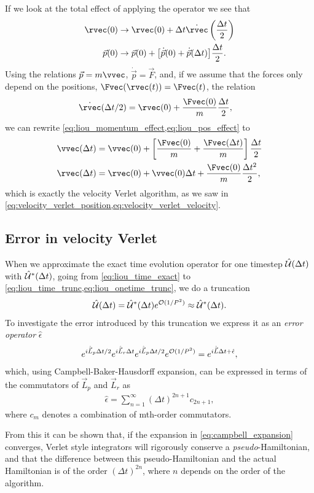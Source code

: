 If we look at the total effect of applying the operator we see that
\begin{align}
    \rvec(0)
    &\rightarrow \rvec(0) + \Delta t \dot\rvec\left(\frac{\Delta t}{2}\right) \label{eq:liou_pos_effect} \\
    \vec p(0) 
    &\rightarrow \vec p(0) + \big[\dot{\vec p}(0) + \dot{\vec p}(\Delta t) \big] \frac{\Delta t}{2} \label{eq:liou_momentum_effect}.
\end{align}
Using the relations $\vec p = m\vvec$, $\dot{\vec p} = \vec F$, and, if we assume that the forces only depend on the positions, $\Fvec(\rvec(t)) = \Fvec(t)$, the relation 
\begin{align*}
    &\dot\rvec(\Delta t/2) = \rvec(0) + \frac{\Fvec(0)}{m} \frac{\Delta t}{2},
\end{align*}
we can rewrite \cref{eq:liou_momentum_effect,eq:liou_pos_effect} to
\begin{align*}
    \vvec(\Delta t) &= \vvec(0) + \left[\frac{\Fvec(0)}{m} + \frac{\Fvec(\Delta t)}{m}\right] \frac{\Delta t}{2} \\
    \rvec(\Delta t) &= \rvec(0) + \vvec(0)\Delta t + \frac{\Fvec(0)}{m}\frac{\Delta t^2}{2},
\end{align*}
which is exactly the velocity Verlet algorithm, as we saw in \cref{eq:velocity_verlet_position,eq:velocity_verlet_velocity}.

\subsection{Error in velocity Verlet\label{subsec:verlet_error_liouville}}
\newcommand{\errop}{\hat{\epsilon}}%
When we approximate the exact time evolution operator for one timestep $\hat{\mathcal{U}} (\Delta t)$ with $\hat{\mathcal{U}}^*(\Delta t)$, going from \cref{eq:liou_time_exact} to \cref{eq:liou_time_trunc,eq:liou_onetime_trunc}, we do a truncation 
\begin{align*}
    \hat{\mathcal{U}}(\Delta t) = \hat{\mathcal{U}}^*(\Delta t) e^{\mathcal{O}(1/P^2)} \approx \hat{\mathcal{U}}^*(\Delta t).
\end{align*}
To investigate the error introduced by this truncation we express it as an \emph{error operator} $\errop$
\begin{align*}
    e^{\Liou_p\Delta t/2} e^{\Liou_r \Delta t} e^{\Liou_p \Delta t/2} e^{\mathcal{O}(1/P^2)}
    = e^{\Liou \Delta t + \errop},
\end{align*}
which, using Campbell-Baker-Hausdorff expansion, can be expressed in terms of the commutators of $\vec L_p$ and $\vec L_r$ as
\begin{align}
    \errop = \sum_{n=1}^\infty (\Delta t)^{2n+1} c_{2n+1},\label{eq:campbell_expansion}
\end{align}
where $c_m$ denotes a combination of mth-order commutators. %

From this it can be shown that, if the expansion in \cref{eq:campbell_expansion} converges, Verlet style integrators will rigorously conserve a \emph{pseudo}-Hamiltonian, and that the difference between this pseudo-Hamiltonian and the actual Hamiltonian is of the order $(\Delta t)^{2n}$, where $n$ depends on the order of the algorithm\cite[section 4.3.3]{frenkel2001understanding}.



